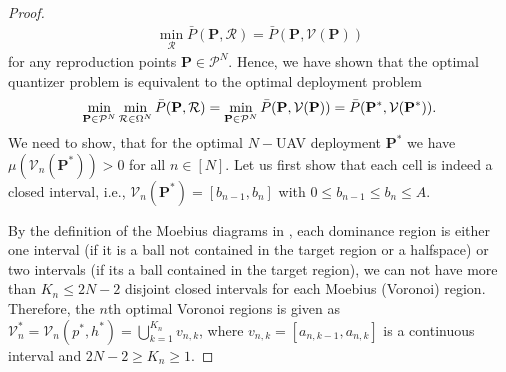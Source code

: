\documentclass[smallabstract,smallcaptions]{dccpaper}
\renewcommand{\vQ}{\mathbf P}
\newcommand{\Pbar}{\ensuremath{\bar{P}}}         %
\newcommand{\Vor}{\ensuremath{\mathcal{V}}}         %
\newcommand{\Rset}{\ensuremath{\mathcal R}}
\newcommand{\Qset}{\ensuremath{\mathcal P}}
\begin{document}
\begin{proof}
\begin{align}
    \min_{\Rset} \Pbar(\vQ,\Rset)=\Pbar(\vQ,\Vor(\vQ))
  \end{align}
  for any reproduction points $\vQ\in\Qset^N$.
  Hence, we have shown that the optimal quantizer problem is equivalent to the optimal deployment problem
  \begin{align}
    \min_{\vQ\in\Qset^N} \min_{\Rset\in\Ome^N} \Pbar(\vQ,\Rset) = \min_{\vQ\in\Qset^N}
    \Pbar(\vQ,\Vor(\vQ))=\Pbar(\vQ^*,\Vor(\vQ^*)).\label{eq:optquanteqoptdeploy}
  \end{align}
  We need to show, that for the optimal $N-$UAV deployment $\vQ^*$ we have $\mu(\Vor_n(\vQ^*))>0$ for all $n\in[N]$.
  Let us first show that each cell is indeed a closed interval, i.e., $\Vor_n(\vQ^*)=[b_{n-1},b_n]$ with $0\leq b_{n-1}\leq
  b_n\leq A$. 
  
  By the definition of the
  Moebius diagrams in , each dominance region is either one interval (if it is a ball not contained
  in the target region or a halfspace) or two intervals (if its a ball contained in the target region), we can not have
  more than $K_n\leq 2N-2$ disjoint closed intervals for each Moebius (Voronoi) region.  Therefore, the $n$th optimal
  Voronoi regions is given as $\Vor^*_n=\Vor_n(p^*, h^*)=\bigcup_{k=1}^{K_n}v_{n,k}$, where $v_{n,k}=[a_{n,k-1},a_{n,k}]$
  is a continuous interval and $2N-2\geq K_n\geq 1$.


\end{proof}
\end{document}
